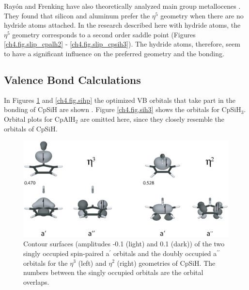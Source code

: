 Ray\'on and Frenking have also theoretically analyzed main group metallocenes \cite{rayon}. They found that silicon and aluminum prefer the $\eta^5$ geometry when there are no hydride atoms attached. In the research described here with hydride atoms, the $\eta^5$ geometry corresponds to a second order saddle point (Figures \ref{ch4.fig.slip_cpalh2} - \ref{ch4.fig.slip_cpsih3}). The hydride atoms, therefore, seem to have a significant influence on the preferred geometry and the bonding. 

\subsection{Valence Bond Calculations}

In Figures \ref{ch4.fig.sihs} and \ref{ch4.fig.sihp} the optimized VB orbitals that take part in the bonding of CpSiH are shown \cite{molden}. Figure \ref{ch4.fig.sih3} shows the orbitals for CpSiH$_3$. Orbital plots for CpAlH$_2$ are omitted here, since they closely resemble the orbitals of CpSiH. 

\begin{figure} [htbp]
\begin{center}
\includegraphics[scale=0.67]{cyclopentadienyl/figures/sih_sigma.eps}
\end{center}
\caption{Contour surfaces (amplitudes -0.1 (light) and 0.1 (dark)) of the two singly occupied spin-paired a$^\prime$ orbitals and the doubly occupied a$^{\prime\prime}$ orbitals for the $\eta^{3}$ (left) and $\eta^{2}$ (right) geometries of CpSiH. The numbers between the singly occupied orbitals are the orbital overlaps.}
\label{ch4.fig.sihs}
\end{figure}

